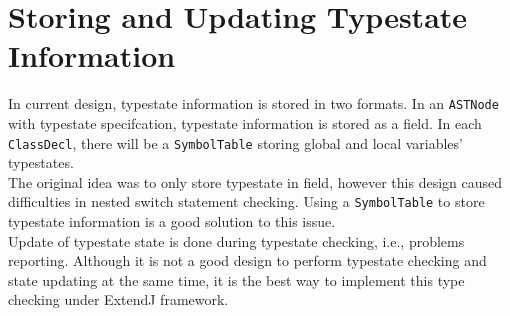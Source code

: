 \documentclass[]{article}
\begin{document}
\section{Storing and Updating Typestate Information}
In current design, typestate information is stored in two formats. In an \texttt{ASTNode} with typestate specifcation, typestate information is stored as a field. In each \texttt{ClassDecl}, there will be a \texttt{SymbolTable} storing global and local variables' typestates.\\[0.2cm]
The original idea was to only store typestate in field, however this design caused difficulties in nested switch statement checking. Using a \texttt{SymbolTable} to store typestate information is a good solution to this issue.\\[0.2cm]
Update of typestate state is done during typestate checking, i.e., problems reporting. Although it is not a good design to perform typestate checking and state updating at the same time, it is the best way to implement this type checking under ExtendJ framework.


%
\end{document}
